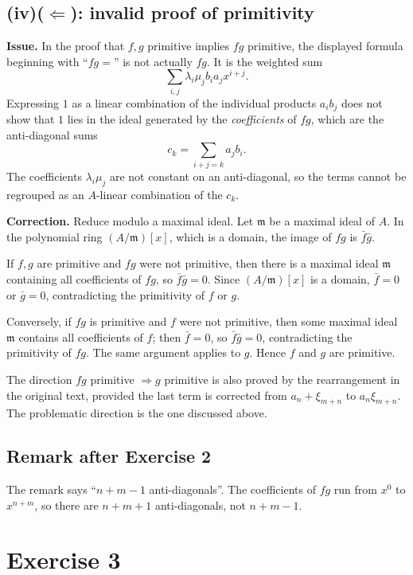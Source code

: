 \documentclass[11pt]{article}
\newcommand{\fm}{\mathfrak m}
\begin{document}
\subsection*{(iv)(\(\Leftarrow\)): invalid proof of primitivity}

\textbf{Issue.}  In the proof that \(f,g\) primitive implies \(fg\) primitive,
the displayed formula beginning with ``\(fg=\)'' is not actually \(fg\).
It is the weighted sum
\[
\sum_{i,j}\lambda_i\mu_jb_ia_jx^{i+j}.
\]
Expressing \(1\) as a linear combination of the individual products
\(a_ib_j\) does not show that \(1\) lies in the ideal generated by the
\emph{coefficients} of \(fg\), which are the anti-diagonal sums
\[
c_k=\sum_{i+j=k}a_jb_i.
\]
The coefficients \(\lambda_i\mu_j\) are not constant on an anti-diagonal, so
the terms cannot be regrouped as an \(A\)-linear combination of the \(c_k\).

\textbf{Correction.}  Reduce modulo a maximal ideal.  Let \(\fm\) be a maximal
ideal of \(A\).  In the polynomial ring \((A/\fm)[x]\), which is a domain, the
image of \(fg\) is \(\bar f\bar g\).

If \(f,g\) are primitive and \(fg\) were not primitive, then there is a
maximal ideal \(\fm\) containing all coefficients of \(fg\), so
\(\bar f\bar g=0\).  Since \((A/\fm)[x]\) is a domain, \(\bar f=0\) or
\(\bar g=0\), contradicting the primitivity of \(f\) or \(g\).

Conversely, if \(fg\) is primitive and \(f\) were not primitive, then some
maximal ideal \(\fm\) contains all coefficients of \(f\); then
\(\bar f=0\), so \(\bar f\bar g=0\), contradicting the primitivity of \(fg\).
The same argument applies to \(g\).  Hence \(f\) and \(g\) are primitive.

The direction \(fg\) primitive \(\Rightarrow g\) primitive is also proved by
the rearrangement in the original text, provided the last term is corrected
from \(a_n+\xi_{m+n}\) to \(a_n\xi_{m+n}\).  The problematic direction is
the one discussed above.

\subsection*{Remark after Exercise 2}
The remark says ``\(n+m-1\) anti-diagonals''.  The coefficients of \(fg\) run
from \(x^0\) to \(x^{n+m}\), so there are \(n+m+1\) anti-diagonals, not
\(n+m-1\).

\section*{Exercise 3}
\end{document}
